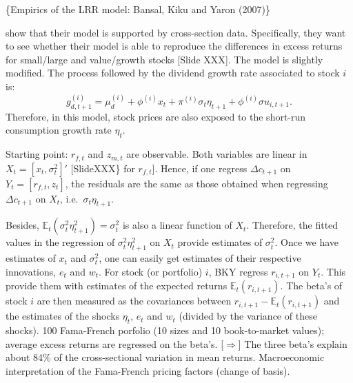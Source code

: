 \documentclass[
  12pt,
]{book}
\theoremstyle{definition}
\theoremstyle{definition}
\theoremstyle{definition}
\theoremstyle{definition}
\theoremstyle{remark}
\begin{document}
\{Empirics of the LRR model: Bansal, Kiku and Yaron (2007)\}

\citet{Bansal_Kiku_Yaron_2016} show that their model is supported by cross-section data.
Specifically, they want to see whether their model is able to reproduce the differences in excess returns for small/large and value/growth stocks {[}Slide XXX{]}.
The model is slightly modified. The process followed by the dividend growth rate associated to stock \(i\) is:
\[
g^{(i)}_{d,t+1} = \mu_d^{(i)} + \phi^{(i)} x_t + \pi^{(i)}\sigma_t \eta_{t+1} +  \phi^{(i)} \sigma u_{i,t+1}.
\]
Therefore, in this model, stock prices are also exposed to the short-run consumption growth rate \(\eta_t\).

Starting point: \(r_{f,t}\) and \(z_{m,t}\) are observable.
Both variables are linear in \(X_t=[x_t,\sigma_t^2]'\) {[}SlideXXX\} for \(r_{f,t}\){]}.
Hence, if one regress \(\Delta c_{t+1}\) on \(Y_t=[r_{f,t},z_t]\), the residuals are the same as those obtained when regressing \(\Delta c_{t+1}\) on \(X_t\), i.e.~\(\sigma_t \eta_{t+1}\).

Besides, \(\mathbb{E}_t(\sigma_t^2 \eta_{t+1}^2)=\sigma_t^2\) is also a linear function of \(X_t\). Therefore, the fitted values in the regression of \(\sigma_t^2 \eta_{t+1}^2\) on \(X_t\) provide estimates of \(\sigma_t^2\).
Once we have estimates of \(x_t\) and \(\sigma^2_t\), one can easily get estimates of their respective innovations, \(e_t\) and \(w_t\).
For stock (or portfolio) \(i\), BKY regress \(r_{i,t+1}\) on \(Y_t\). This provide them with estimates of the expected returns \(\mathbb{E}_t(r_{i,t+1})\). The beta's of stock \(i\) are then measured as the covariances between \(r_{i,t+1}-\mathbb{E}_t(r_{i,t+1})\) and the estimates of the shocks \(\eta_t\), \(e_t\) and \(w_t\) (divided by the variance of these shocks).
100 Fama-French porfolio (10 sizes and 10 book-to-market values); average excess returns are regressed on the beta's.
{[}\(\Rightarrow\){]} The three beta's explain about 84\% of the cross-sectional variation in mean returns.
Macroeconomic interpretation of the Fama-French pricing factors (change of basis).
\end{document}
